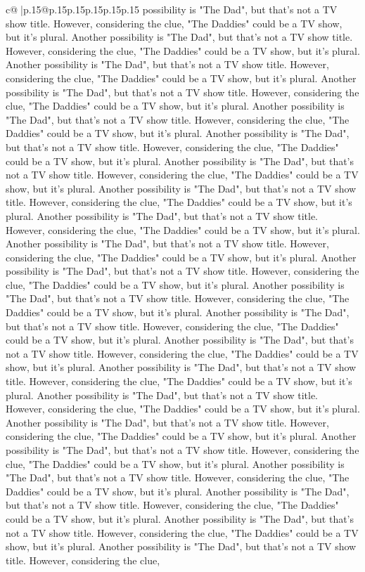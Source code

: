 \documentclass{article}
\begin{document}
{\begin{supertabular}{c@{$\;$}|p{.15\linewidth}@{}p{.15\linewidth}p{.15\linewidth}p{.15\linewidth}p{.15\linewidth}p{.15\linewidth}}
{{{possibility is "The Dad", but that's not a TV show title. However, considering the clue, "The Daddies" could be a TV show, but it's plural. Another possibility is "The Dad", but that's not a TV show title. However, considering the clue, "The Daddies" could be a TV show, but it's plural. Another possibility is "The Dad", but that's not a TV show title. However, considering the clue, "The Daddies" could be a TV show, but it's plural. Another possibility is "The Dad", but that's not a TV show title. However, considering the clue, "The Daddies" could be a TV show, but it's plural. Another possibility is "The Dad", but that's not a TV show title. However, considering the clue, "The Daddies" could be a TV show, but it's plural. Another possibility is "The Dad", but that's not a TV show title. However, considering the clue, "The Daddies" could be a TV show, but it's plural. Another possibility is "The Dad", but that's not a TV show title. However, considering the clue, "The Daddies" could be a TV show, but it's plural. Another possibility is "The Dad", but that's not a TV show title. However, considering the clue, "The Daddies" could be a TV show, but it's plural. Another possibility is "The Dad", but that's not a TV show title. However, considering the clue, "The Daddies" could be a TV show, but it's plural. Another possibility is "The Dad", but that's not a TV show title. However, considering the clue, "The Daddies" could be a TV show, but it's plural. Another possibility is "The Dad", but that's not a TV show title. However, considering the clue, "The Daddies" could be a TV show, but it's plural. Another possibility is "The Dad", but that's not a TV show title. However, considering the clue, "The Daddies" could be a TV show, but it's plural. Another possibility is "The Dad", but that's not a TV show title. However, considering the clue, "The Daddies" could be a TV show, but it's plural. Another possibility is "The Dad", but that's not a TV show title. However, considering the clue, "The Daddies" could be a TV show, but it's plural. Another possibility is "The Dad", but that's not a TV show title. However, considering the clue, "The Daddies" could be a TV show, but it's plural. Another possibility is "The Dad", but that's not a TV show title. However, considering the clue, "The Daddies" could be a TV show, but it's plural. Another possibility is "The Dad", but that's not a TV show title. However, considering the clue, "The Daddies" could be a TV show, but it's plural. Another possibility is "The Dad", but that's not a TV show title. However, considering the clue, "The Daddies" could be a TV show, but it's plural. Another possibility is "The Dad", but that's not a TV show title. However, considering the clue, "The Daddies" could be a TV show, but it's plural. Another possibility is "The Dad", but that's not a TV show title. However, considering the clue, "The Daddies" could be a TV show, but it's plural. Another possibility is "The Dad", but that's not a TV show title. However, considering the clue, "The Daddies" could be a TV show, but it's plural. Another possibility is "The Dad", but that's not a TV show title. However, considering the clue, }}}
\end{supertabular}}
\end{document}
